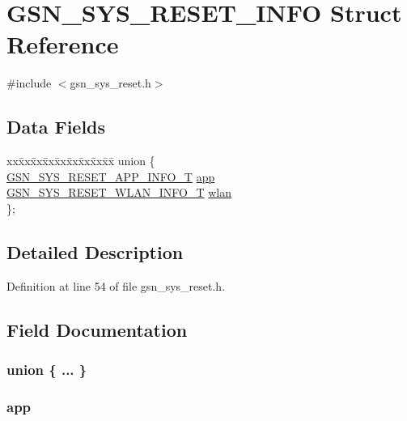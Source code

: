 \hypertarget{a00257}{
\section{GSN\_\-SYS\_\-RESET\_\-INFO Struct Reference}
\label{a00257}
}


{\ttfamily \#include $<$gsn\_\-sys\_\-reset.h$>$}

\subsection*{Data Fields}
\begin{DoxyCompactItemize}
\item 
\begin{tabbing}
xx\=xx\=xx\=xx\=xx\=xx\=xx\=xx\=xx\=\kill
union \{\\
\>\hyperlink{a00256}{GSN\_SYS\_RESET\_APP\_INFO\_T} \hyperlink{a00257_aa7236277b4fa68b299ce1fcc8ca6c11b}{app}\\
\>\hyperlink{a00258}{GSN\_SYS\_RESET\_WLAN\_INFO\_T} \hyperlink{a00257_a57220e8a2737550385ffa2aea52ff301}{wlan}\\
\}; \\

\end{tabbing}\end{DoxyCompactItemize}


\subsection{Detailed Description}


Definition at line 54 of file gsn\_\-sys\_\-reset.h.



\subsection{Field Documentation}
\hypertarget{a00257_a42aa120ae8fe4efb41cc3607f535812e}{
\subsubsection[{"@1}]{\setlength{\rightskip}{0pt plus 5cm}union \{ ... \} }}
\label{a00257_a42aa120ae8fe4efb41cc3607f535812e}
\hypertarget{a00257_aa7236277b4fa68b299ce1fcc8ca6c11b}{
\subsubsection[{app}]{ {\bf app}}}
\label{a00257_aa7236277b4fa68b299ce1fcc8ca6c11b}


